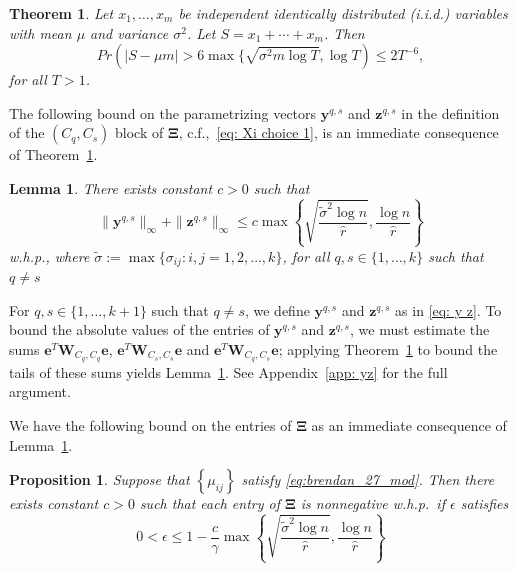 \documentclass[twoside,11pt]{article}
\newtheorem{theorem}{Theorem}[section]
\newtheorem{proposition}{Proposition}[section]
\newtheorem{lemma}{Lemma}[section]
\newcommand{\e}{\bs {e}}
\newcommand{\bs}{\boldsymbol}
\newcommand{\y}{\bs {y}}
\newcommand{\W}{\bs {W}}
\newcommand{\z}{\bs{z}}
\newcommand{\0}{\bs{0}}
\newcommand{\bra}[1]{\ensuremath{\left\{ #1 \right\}}} %
\newcommand{\iid}{independent identically distributed (i.i.d.) }
\begin{document}
{\begin{theorem}
	\label{thm: Hoeffding}
	Let $x_1, \dots, x_m$ be \iid variables with mean $\mu$
	and variance $\sigma^2$.
	Let $S = x_1 + \cdots + x_m$. Then
	\begin{equation}
	\label{eq:hoeffding}
	Pr( |S - \mu m| > 6 \max \{\sqrt{\sigma^2 m \log T}, \log T )
	 \le 2 T^{-6},
	\end{equation}
	for all $T > 1$.
\end{theorem}

The following bound
on the parametrizing vectors \(\y^{q,s}\) and \(\z^{q,s}\) in the definition of the \((C_q, C_s)\) block of \(\bs\Xi\), c.f.,~\eqref{eq: Xi choice 1},
is an immediate consequence of Theorem~\ref{thm: Hoeffding}.

\begin{lemma}
	\label{lem: yz bound}
	There exists constant $c > 0$ such that
	\begin{equation} \label{eq: yz bound}
		\|\bs{y}^{q,s}\|_{\infty} +  \|\bs{z}^{q,s}\|_{\infty} \leq
		c \max \bra{ \sqrt{ \frac{\tilde \sigma^2 \log n}{\hat r}} ,
			\frac{\log n}{\hat r} }
	\end{equation}
	w.h.p.,
	where $\tilde \sigma := \max \{ \sigma_{ij} : i,j = 1,2,\dots, k\}$,
	for all \(q,s \in \{1,\dots,k\}\) such that 	$q \neq s$
\end{lemma}

For \(q,s \in \{1,\dots, k+1\}\) such that \(q \neq s\), we define \(\y^{q,s}\) and \(\z^{q,s}\) as in \eqref{eq: y z}. To bound
the absolute values of the entries of \(\y^{q,s}\) and \(\z^{q,s}\), we must estimate the sums \(\e^T \W_{C_q, C_q} \e\),
\(\e^T \W_{C_s, C_s} \e \) and \(\e^T \W_{C_q, C_s} \e \); applying Theorem~\ref{thm: Hoeffding} to bound the tails
of these sums yields Lemma~\ref{lem: yz bound}. See Appendix~\ref{app: yz} for the full argument.

We have the following bound on the entries of \(\bs \Xi\) as an immediate consequence of  Lemma~\ref{lem: yz bound}.

\begin{proposition}
	\label{thm: Xi bound}
	Suppose that $\bra{\mu_{ij}}$ satisfy \eqref{eq:brendan_27_mod}.
	Then there exists constant $c>0$ such that each entry of $\bs{\Xi}$ is nonnegative w.h.p.~if \(\epsilon\) 	satisfies
	\begin{equation} \label{eq: xi eps}
	0 < \epsilon \leq
		1 - \frac{c}{\gamma}\max \bra{ \sqrt{ \frac{\tilde \sigma^2 \log n}{\hat r}} ,
			\frac{\log n}{\hat r}  }
	\end{equation}
\end{proposition}

}
\end{document}
